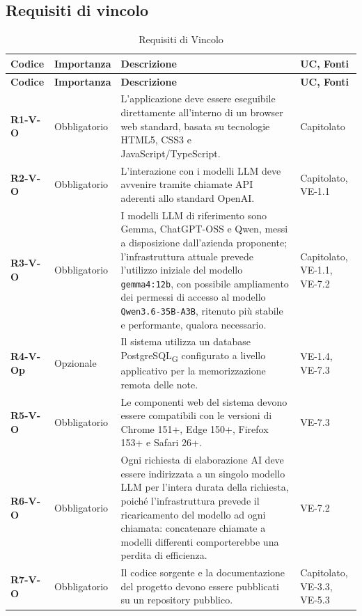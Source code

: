 \subsection{Requisiti di vincolo}
\label{sec:req-vincolo}
\begin{longtable}{|p{2.5cm}|p{2.2cm}|p{6.8cm}|p{2.7cm}|}
	\caption{Requisiti di Vincolo\label{tab:req-vincolo}} \\
	\hline
	\rowcolor{primarycolor!10}
	\textbf{Codice} & \textbf{Importanza} & \textbf{Descrizione} & \textbf{UC, Fonti} \\
	\hline
	\endfirsthead
	\hline
	\rowcolor{primarycolor!10}
	\textbf{Codice} & \textbf{Importanza} & \textbf{Descrizione} & \textbf{UC, Fonti} \\
	\hline
	\endhead

	\textbf{R1-V-O} & Obbligatorio & L'applicazione deve essere eseguibile direttamente all'interno di un browser web standard, basata su tecnologie HTML5, CSS3 e JavaScript/TypeScript. & Capitolato \\ \hline
	\textbf{R2-V-O} & Obbligatorio & L'interazione con i modelli LLM deve avvenire tramite chiamate API aderenti allo standard OpenAI. & Capitolato, VE-1.1 \\ \hline
	\textbf{R3-V-O} & Obbligatorio & I modelli LLM di riferimento sono Gemma, ChatGPT-OSS e Qwen, messi a disposizione dall'azienda proponente; l'infrastruttura attuale prevede l'utilizzo iniziale del modello \texttt{gemma4:12b}, con possibile ampliamento dei permessi di accesso al modello \texttt{Qwen3.6-35B-A3B}, ritenuto più stabile e performante, qualora necessario. & Capitolato, VE-1.1, VE-7.2 \\ \hline
	\textbf{R4-V-Op} & Opzionale & Il sistema utilizza un database PostgreSQL\textsubscript{G} configurato a livello applicativo per la memorizzazione remota delle note. & VE-1.4, VE-7.3 \\ \hline
	\textbf{R5-V-O} & Obbligatorio & Le componenti web del sistema devono essere compatibili con le versioni di Chrome 151+, Edge 150+, Firefox 153+ e Safari 26+. & VE-7.3 \\ \hline
	\textbf{R6-V-O} & Obbligatorio & Ogni richiesta di elaborazione AI deve essere indirizzata a un singolo modello LLM per l'intera durata della richiesta, poiché l'infrastruttura prevede il ricaricamento del modello ad ogni chiamata: concatenare chiamate a modelli differenti comporterebbe una perdita di efficienza. & VE-7.2 \\ \hline
	\textbf{R7-V-O} & Obbligatorio & Il codice sorgente e la documentazione del progetto devono essere pubblicati su un repository pubblico. & Capitolato, VE-3.3, VE-5.3 \\ \hline


\end{longtable}
